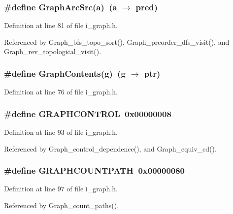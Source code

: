 \subsubsection{\setlength{\rightskip}{0pt plus 5cm}\#define Graph\-Arc\-Src(a)~(a $\rightarrow$ pred)}\label{i__graph_8h_fafba580d7d37ccd27e8e5c80444d11a}




Definition at line 81 of file i\_\-graph.h.

Referenced by Graph\_\-bfs\_\-topo\_\-sort(), Graph\_\-preorder\_\-dfs\_\-visit(), and Graph\_\-rev\_\-topological\_\-visit().
\subsubsection{\setlength{\rightskip}{0pt plus 5cm}\#define Graph\-Contents(g)~(g $\rightarrow$ ptr)}\label{i__graph_8h_435b6f14ab2a3c78b27b9a612bbe2fc3}




Definition at line 76 of file i\_\-graph.h.
\subsubsection{\setlength{\rightskip}{0pt plus 5cm}\#define GRAPHCONTROL~0x00000008}\label{i__graph_8h_ee8ab7f8f13f5716067e2ec7d15b9f06}




Definition at line 93 of file i\_\-graph.h.

Referenced by Graph\_\-control\_\-dependence(), and Graph\_\-equiv\_\-cd().
\subsubsection{\setlength{\rightskip}{0pt plus 5cm}\#define GRAPHCOUNTPATH~0x00000080}\label{i__graph_8h_80aa73fd7b3a6cdd3173f57dff133bc3}




Definition at line 97 of file i\_\-graph.h.

Referenced by Graph\_\-count\_\-paths().

